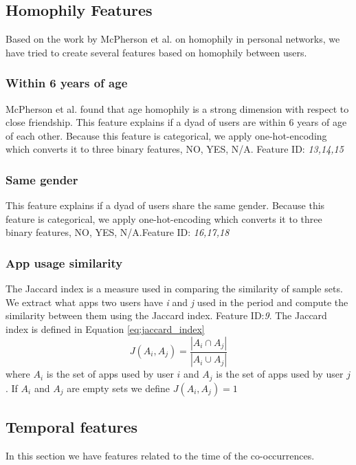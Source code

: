 \subsection{Homophily Features}
Based on the work by McPherson et al.\cite{mcpherson2001birds} on homophily in personal networks, we have tried to create several features based on homophily between users.

\subsubsection{Within 6 years of age}
McPherson et al.\cite{mcpherson2001birds} found that age homophily is a strong dimension with respect to close friendship.
This feature explains if a dyad of users are within 6 years of age of each other.
Because this feature is categorical, we apply one-hot-encoding which converts it to three binary features, NO, YES, N/A. Feature ID: \textit{13,14,15}

\subsubsection{Same gender}
This feature explains if a dyad of users share the same gender. 
Because this feature is categorical, we apply one-hot-encoding which converts it to three binary features, NO, YES, N/A.Feature ID: \textit{16,17,18}

\subsubsection{App usage similarity}
The Jaccard index is a measure used in comparing the similarity of sample sets. We extract what apps two users have \textit{i} and \textit{j} used in the period and compute the similarity between them using the Jaccard index. Feature ID:\textit{9}.
The Jaccard index is defined in Equation \ref{eq:jaccard_index}
\begin{equation}
\label{eq:jaccard_index}
J(A_i,A_j) = \frac{ |A_i \cap A_j| }{ |A_i \cup A_j | }
\end{equation}
where $A_i$ is the set of apps used by user $i$ and $A_j$ is the set of apps used by user $j$. If $A_i$ and $A_j$ are empty sets we define $J(A_i, A_j) = 1$

\subsection{Temporal features}
In this section we have features related to the time of the co-occurrences.

